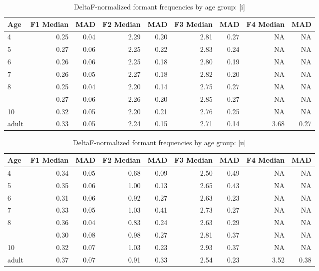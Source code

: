\documentclass[
]{article}
\begin{document}
\begin{table}[!h]

\caption{\label{tab:deltaf-measurement-table-i}DeltaF-normalized formant frequencies by age group: [i]}
\centering
\begin{tabular}[t]{lrrrrrrrr}
\toprule
Age & F1 Median & MAD & F2 Median & MAD & F3 Median & MAD & F4 Median & MAD\\
\midrule
4 & 0.25 & 0.04 & 2.29 & 0.20 & 2.81 & 0.27 & NA & NA\\
5 & 0.27 & 0.06 & 2.25 & 0.22 & 2.83 & 0.24 & NA & NA\\
6 & 0.26 & 0.06 & 2.25 & 0.18 & 2.80 & 0.19 & NA & NA\\
7 & 0.26 & 0.05 & 2.27 & 0.18 & 2.82 & 0.20 & NA & NA\\
8 & 0.25 & 0.04 & 2.20 & 0.14 & 2.75 & 0.27 & NA & NA\\
\addlinespace
9 & 0.27 & 0.06 & 2.26 & 0.20 & 2.85 & 0.27 & NA & NA\\
10 & 0.32 & 0.05 & 2.20 & 0.21 & 2.76 & 0.25 & NA & NA\\
adult & 0.33 & 0.05 & 2.24 & 0.15 & 2.71 & 0.14 & 3.68 & 0.27\\
\bottomrule
\end{tabular}
\end{table}

\begin{table}[!h]

\caption{\label{tab:deltaf-measurement-table-u}DeltaF-normalized formant frequencies by age group: [u]}
\centering
\begin{tabular}[t]{lrrrrrrrr}
\toprule
Age & F1 Median & MAD & F2 Median & MAD & F3 Median & MAD & F4 Median & MAD\\
\midrule
4 & 0.34 & 0.05 & 0.68 & 0.09 & 2.50 & 0.49 & NA & NA\\
5 & 0.35 & 0.06 & 1.00 & 0.13 & 2.65 & 0.43 & NA & NA\\
6 & 0.31 & 0.06 & 0.92 & 0.27 & 2.63 & 0.23 & NA & NA\\
7 & 0.33 & 0.05 & 1.03 & 0.41 & 2.73 & 0.27 & NA & NA\\
8 & 0.36 & 0.04 & 0.83 & 0.24 & 2.63 & 0.29 & NA & NA\\
\addlinespace
9 & 0.30 & 0.08 & 0.98 & 0.27 & 2.81 & 0.37 & NA & NA\\
10 & 0.32 & 0.07 & 1.03 & 0.23 & 2.93 & 0.37 & NA & NA\\
adult & 0.37 & 0.07 & 0.91 & 0.33 & 2.54 & 0.23 & 3.52 & 0.38\\
\bottomrule
\end{tabular}
\end{table}
\end{document}
